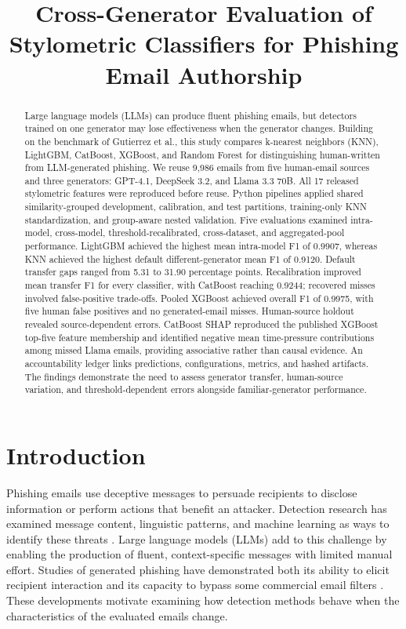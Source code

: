 \documentclass[conference]{IEEEtran}
\title{Cross-Generator Evaluation of Stylometric Classifiers for Phishing Email Authorship}
\begin{document}
\maketitle

\begin{abstract}
Large language models (LLMs) can produce fluent phishing emails,
but detectors trained on one generator may lose effectiveness
when the generator changes. Building on the benchmark of
Gutierrez et al., this study compares k-nearest neighbors (KNN),
LightGBM, CatBoost, XGBoost, and Random Forest for distinguishing
human-written from LLM-generated phishing. We reuse 9,986 emails
from five human-email sources and three generators: GPT-4.1,
DeepSeek 3.2, and Llama 3.3 70B. All 17 released stylometric
features were reproduced before reuse. Python pipelines applied
shared similarity-grouped development, calibration, and test
partitions, training-only KNN standardization, and group-aware
nested validation. Five evaluations examined intra-model,
cross-model, threshold-recalibrated, cross-dataset, and
aggregated-pool performance. LightGBM achieved the highest
mean intra-model F1 of 0.9907, whereas KNN achieved the highest
default different-generator mean F1 of 0.9120. Default transfer
gaps ranged from 5.31 to 31.90 percentage points. Recalibration
improved mean transfer F1 for every classifier, with CatBoost
reaching 0.9244; recovered misses involved false-positive
trade-offs. Pooled XGBoost achieved overall F1 of 0.9975,
with five human false positives and no generated-email misses.
Human-source holdout revealed source-dependent errors.
CatBoost SHAP reproduced the published XGBoost top-five feature
membership and identified negative mean time-pressure
contributions among missed Llama emails, providing associative
rather than causal evidence. An accountability ledger links
predictions, configurations, metrics, and hashed artifacts.
The findings demonstrate the need to assess generator transfer,
human-source variation, and threshold-dependent errors alongside
familiar-generator performance.
\end{abstract}

\section{Introduction}
\label{sec:introduction}

Phishing emails use deceptive messages to persuade recipients to
disclose information or perform actions that benefit an attacker.
Detection research has examined message content, linguistic patterns,
and machine learning as ways to identify these threats
\cite{salloum2022}. Large language models (LLMs) add to this challenge
by enabling the production of fluent, context-specific messages with
limited manual effort. Studies of generated phishing have demonstrated
both its ability to elicit recipient interaction and its capacity to
bypass some commercial email filters
\cite{heiding2024,opara2025}. These developments motivate examining
how detection methods behave when the characteristics of the
evaluated emails change.
\end{document}
